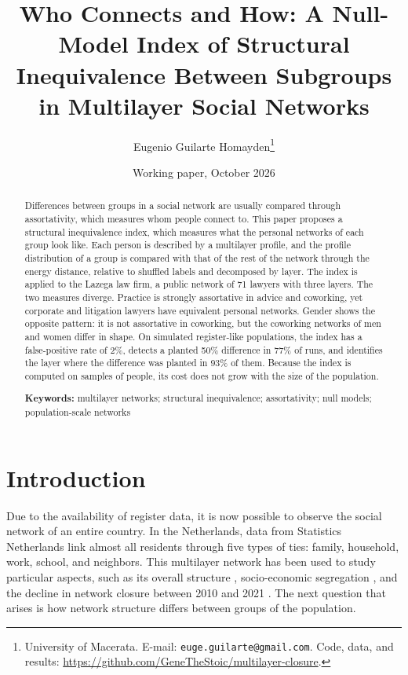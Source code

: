 \documentclass[11pt]{article}
\title{Who Connects and How: A Null-Model Index of Structural Inequivalence Between Subgroups in Multilayer Social Networks}
\author{Eugenio Guilarte Homayden\thanks{University of Macerata. E-mail: \texttt{euge.guilarte@gmail.com}. Code, data, and results: \url{https://github.com/GeneTheStoic/multilayer-closure}.}}
\date{Working paper, October 2026}
\begin{document}
\maketitle

\begin{abstract}
\noindent Differences between groups in a social network are usually compared through assortativity, which measures whom people connect to. This paper proposes a structural inequivalence index, which measures what the personal networks of each group look like. Each person is described by a multilayer profile, and the profile distribution of a group is compared with that of the rest of the network through the energy distance, relative to shuffled labels and decomposed by layer. The index is applied to the Lazega law firm, a public network of 71 lawyers with three layers. The two measures diverge. Practice is strongly assortative in advice and coworking, yet corporate and litigation lawyers have equivalent personal networks. Gender shows the opposite pattern: it is not assortative in coworking, but the coworking networks of men and women differ in shape. On simulated register-like populations, the index has a false-positive rate of 2\%, detects a planted 50\% difference in 77\% of runs, and identifies the layer where the difference was planted in 93\% of them. Because the index is computed on samples of people, its cost does not grow with the size of the population.

\medskip
\noindent\raggedright\textbf{Keywords:} multilayer networks; structural inequivalence; assortativity; null models; population-scale networks\par
\end{abstract}

\section{Introduction}
Due to the availability of register data, it is now possible to observe the social network of an entire country. In the Netherlands, data from Statistics Netherlands link almost all residents through five types of ties: family, household, work, school, and neighbors. This multilayer network has been used to study particular aspects, such as its overall structure \citep{bokanyi2023}, socio-economic segregation \citep{kazmina2024}, and the decline in network closure between 2010 and 2021 \citep{bokanyi2026}. The next question that arises is how network structure differs between groups of the population.
\end{document}
